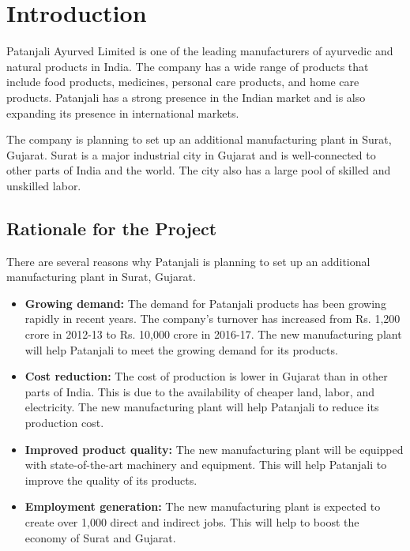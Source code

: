 \newpage
\section{Introduction}
Patanjali Ayurved Limited is one of the leading manufacturers of ayurvedic and natural products in India. The company has a wide range of products that include food products, medicines, personal care products, and home care products. Patanjali has a strong presence in the Indian market and is also expanding its presence in international markets.

The company is planning to set up an additional manufacturing plant in Surat, Gujarat. Surat is a major industrial city in Gujarat and is well-connected to other parts of India and the world. The city also has a large pool of skilled and unskilled labor.

\subsection{Rationale for the Project}
There are several reasons why Patanjali is planning to set up an additional manufacturing plant in Surat, Gujarat.
\begin{itemize}
    \item \textbf{Growing demand:} The demand for Patanjali products has been growing rapidly in recent years. The company's turnover has increased from Rs. 1,200 crore in 2012-13 to Rs. 10,000 crore in 2016-17. The new manufacturing plant will help Patanjali to meet the growing demand for its products.
    \item \textbf{Cost reduction:} The cost of production is lower in Gujarat than in other parts of India. This is due to the availability of cheaper land, labor, and electricity. The new manufacturing plant will help Patanjali to reduce its production cost.
    \item \textbf{Improved product quality:} The new manufacturing plant will be equipped with state-of-the-art machinery and equipment. This will help Patanjali to improve the quality of its products.
    \item \textbf{Employment generation:} The new manufacturing plant is expected to create over 1,000 direct and indirect jobs. This will help to boost the economy of Surat and Gujarat.
\end{itemize}


